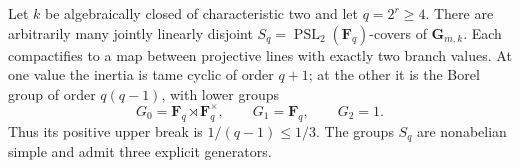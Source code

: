 \begin{proposition}
\label{D:psl2-bounded-conductor-covers}
Let $k$ be algebraically closed of characteristic two and let $q=2^r\ge4$.
There are arbitrarily many jointly linearly disjoint
$S_q=\operatorname{PSL}_2(\mathbf F_q)$-covers of $\mathbf G_{m,k}$.
Each compactifies to a map between projective lines with exactly two
branch values. At one value the inertia is tame cyclic of order $q+1$;
at the other it is the Borel group of order $q(q-1)$, with lower groups
\[
 G_0=\mathbf F_q\rtimes\mathbf F_q^\times,
 \qquad G_1=\mathbf F_q,
 \qquad G_2=1.
\]
Thus its positive upper break is $1/(q-1)\le1/3$. The groups $S_q$ are
nonabelian simple and admit three explicit generators.
\end{proposition}
